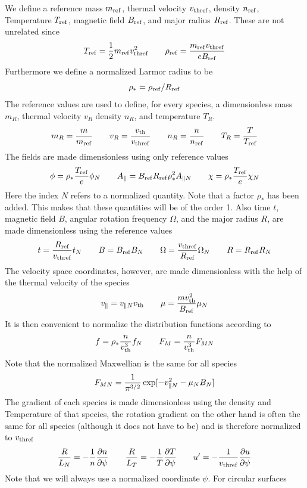 \documentclass{report}
\def\be{\begin{equation}}
\def\ee{\end{equation}}
\begin{document}
We define a reference mass $m_{\rm ref}$, thermal velocity $v_{\rm thref}$, density $n_{\rm ref}$, 
Temperature $T_{\rm ref}$, magnetic field $B_{\rm ref}$, and major radius $R_{\rm ref}$. These 
are not unrelated since 
\be 
T_{\rm ref} = {1 \over 2} m_{\rm ref} v_{\rm thref}^2 \qquad 
\rho_{\rm ref} = {m_{\rm ref} v_{\rm thref} \over e B_{\rm ref}}
\ee
Furthermore we define a normalized Larmor radius to be 
\be 
\rho_* = \rho_{\rm ref} / R_{\rm ref} 
\ee
The reference values are used to define, for every species, a dimensionless mass $m_R$, thermal 
velocity $v_R$ density $n_R$, and temperature $T_R$. 
\be 
m_R = {m \over m_{\rm ref} } 
\qquad 
v_R = {v_{\rm th} \over v_{\rm thref}}
\qquad 
n_R = {n \over n_{\rm ref} }
\qquad 
T_R = {T \over T_{\rm ref}}
\ee 
The fields are made dimensionless using only reference values 
\be 
\phi = \rho_* {T_{\rm ref} \over e} \phi_N 
\qquad 
A_\parallel = B_{\rm ref} R_{\rm ref} \rho_*^2 A_{\parallel N}
\qquad 
\chi = \rho_* {T_{\rm ref} \over e} \chi_N 
\ee 
Here the index $N$ refers to a normalized quantity. 
Note that a factor $\rho_*$ has been added. This makes that these quantities will be of the 
order 1. 
Also time $t$, magnetic field $B$, angular rotation frequency $\Omega$, and the major radius $R$,
are made dimensionless using the reference values 
\be
t = { R_{\rm ref} \over v_{\rm thref}} t_N 
\qquad 
B = B_{\rm ref} B_N
\qquad 
\Omega = {v_{\rm thref} \over R_{\rm ref}} \Omega_N 
\qquad 
R = R_{\rm ref} R_N
\ee
The velocity space coordinates, however, are made dimensionless with the help of 
the thermal velocity of the species 
\be 
v_\parallel = v_{\parallel N} v_{\rm th} 
\qquad 
\mu = {m v_{\rm th}^2 \over B_{\rm ref}} \mu_N
\ee
It is then convenient to normalize the distribution functions according to 
\be 
f = \rho_* {n \over v_{\rm th}^3} f_N 
\qquad 
F_M = {n \over v_{\rm th}^3} F_{MN}
\ee 
Note that the normalized Maxwellian is the same for all species 
\be 
F_{MN} = {1 \over \pi^{3/2}} \exp [ - v_{\parallel N}^2 - \mu_N B_N ] 
\ee
The gradient of each species is made dimensionless using the density and 
Temperature of that species, the rotation gradient on the other hand is 
often the same for all species (although it does not have to be) and is
therefore normalized to $v_{\rm thref}$ 
\be 
{R\over L_N} = - {1\over n} {\partial n \over \partial \psi} 
\qquad 
{R \over L_T} = - {1 \over T} {\partial T \over \partial \psi} 
\qquad 
u^\prime = - {1\over v_{\rm thref}} {\partial u \over \partial \psi}
\label{eq:gradients}
\ee
Note that we will always use a normalized coordinate $\psi$. For circular surfaces 
\end{document}
